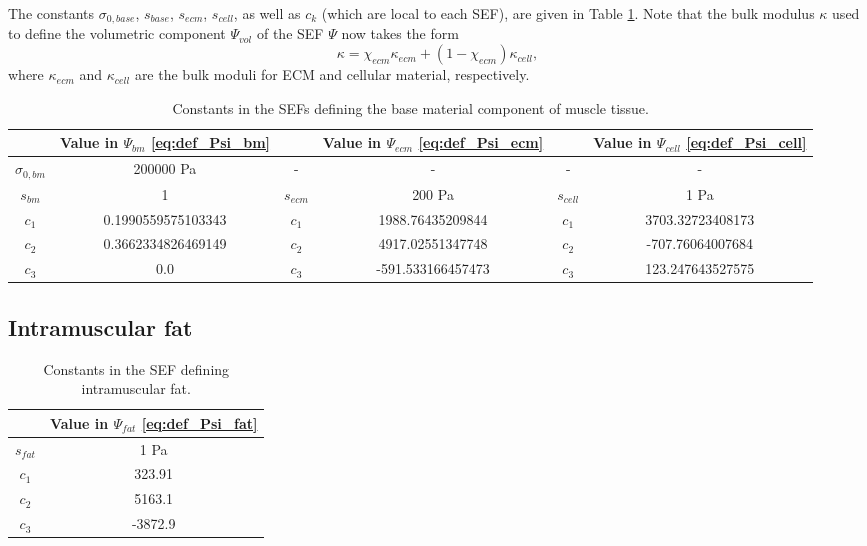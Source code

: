 \documentclass{sfuthesis}
\numberwithin{equation}{section}
\numberwithin{figure}{chapter}
\numberwithin{table}{chapter}
\theoremstyle{definition}
\begin{document}
The constants $\sigma_{0,base}$, $s_{base}$, $s_{ecm}$, $s_{cell}$, as well as $c_k$ (which are local to each SEF), are given in Table \ref{tab:constants_base_material_muscle}. Note that the bulk modulus $\kappa$ used to define the volumetric component $\Psi_{vol}$ of the SEF $\Psi$ now takes the form
\begin{equation} \label{eq:def_kappa_ecm_cell}
    \kappa = \chi_{ecm} \kappa_{ecm} + (1-\chi_{ecm}) \kappa_{cell},
\end{equation}
where $\kappa_{ecm}$ and $\kappa_{cell}$ are the bulk moduli for ECM and cellular material, respectively.

\begin{table}
    \centering
    \begin{tabular}{|c|c|c|c|c|c|}\hline
        & Value in $\Psi_{bm}$ \eqref{eq:def_Psi_bm} & & Value in $\Psi_{ecm}$ \eqref{eq:def_Psi_ecm} & & Value in $\Psi_{cell}$ \eqref{eq:def_Psi_cell} \\\hline
        $\sigma_{0,bm}$ & 200000 \si{Pa} & - & - & - & - \\\hline
        $s_{bm}$ & 1 & $s_{ecm}$ & 200 \si{Pa} & $s_{cell}$ & 1 \si{Pa} \\\hline
        $c_1$ & 0.1990559575103343 & $c_1$ & 1988.76435209844 & $c_1$ & 3703.32723408173 \\\hline
        $c_2$ & 0.3662334826469149 & $c_2$ & 4917.02551347748 & $c_2$ & -707.76064007684 \\\hline
        $c_3$ & 0.0 & $c_3$ & -591.533166457473 & $c_3$ & 123.247643527575 \\\hline
    \end{tabular}
    \caption{Constants in the SEFs defining the base material component of muscle tissue.
    \label{tab:constants_base_material_muscle}}
\end{table}

\subsection{Intramuscular fat} \label{sec:intramuscular_fat}

\begin{table}
    \centering
    \begin{tabular}{|c|c|}\hline
        & Value in $\Psi_{fat}$ \eqref{eq:def_Psi_fat} \\\hline
        $s_{fat}$ & 1 \si{Pa} \\\hline
        $c_1$ & 323.91 \\\hline
        $c_2$ & 5163.1 \\\hline
        $c_3$ & -3872.9 \\\hline
    \end{tabular}
    \caption{Constants in the SEF defining intramuscular fat. \label{tab:constants_fat}}
\end{table}
\end{document}
